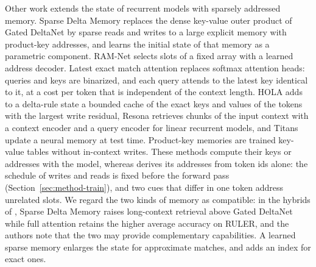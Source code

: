 Other work extends the state of recurrent models with sparsely addressed memory. Sparse Delta
Memory \citep{cabannes2026} replaces the dense key-value outer product of Gated DeltaNet by sparse
reads and writes to a large explicit memory with product-key addresses, and learns the initial
state of that memory as a parametric component. RAM-Net \citep{xiao2026} selects slots of a fixed
array with a learned address decoder. Latest exact match attention \citep{broesamle2026} replaces
softmax attention heads: queries and keys are binarized, and each query attends to the latest key
identical to it, at a cost per token that is independent of the context length. HOLA
\citep{cui2026} adds to a delta-rule state a bounded cache of the exact keys and values of the
tokens with the largest write residual, Resona \citep{wang2025resona} retrieves chunks of the
input context with a context encoder and a query encoder for linear recurrent models, and Titans \citep{behrouz2025}
update a neural memory at test time. Product-key memories \citep{lample2019,berges2025} are trained key-value tables
without in-context writes. These methods compute their keys or addresses with the model,
whereas \ingram{} derives its addresses from token ids alone: the schedule of writes and reads is
fixed before the forward pass (Section~\ref{sec:method-train}), and two cues that differ in one
token address unrelated slots. We regard the two kinds of memory as compatible: in the
hybrids of \citet{cabannes2026}, Sparse Delta Memory raises long-context retrieval above Gated
DeltaNet while full attention retains the higher average accuracy on RULER, and the authors note that the
two may provide complementary capabilities. A learned sparse memory enlarges the state for
approximate matches, and \ingram{} adds an index for exact ones.
